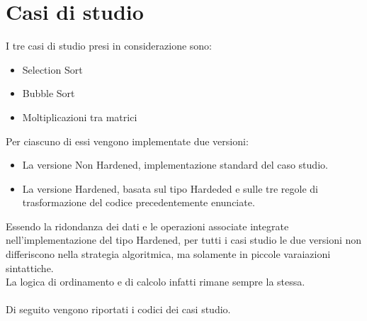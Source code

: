 \section{Casi di studio}\label{sec:CaseStudies}
I tre casi di studio presi in considerazione sono: 
\begin{itemize}
    \item Selection Sort
    \item Bubble Sort
    \item Moltiplicazioni tra matrici
\end{itemize}
Per ciascuno di essi vengono implementate due versioni:
\begin{itemize}
    \item La versione Non Hardened, implementazione standard del caso studio.
    \item La versione Hardened, basata sul tipo Hardeded e sulle tre regole di trasformazione del codice precedentemente enunciate.
\end{itemize}
Essendo la ridondanza dei dati e le operazioni associate integrate nell'implementazione del tipo Hardened, per tutti i casi studio le due versioni non differiscono nella strategia algoritmica, ma solamente in piccole varaiazioni sintattiche.
\\ La logica di ordinamento e di calcolo infatti rimane sempre la stessa. \\ \\
Di seguito vengono riportati i codici dei casi studio.
